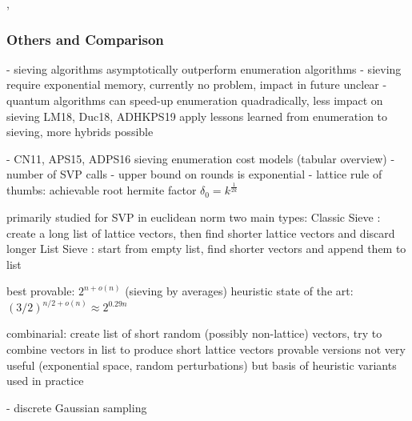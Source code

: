 {\cite{ADHKPS19}, \cite{AGPS20}

\subsubsection{Others and Comparison}

- sieving algorithms asymptotically outperform enumeration algorithms
- sieving require exponential memory, currently no problem, impact in future unclear
- quantum algorithms can speed-up enumeration quadradically, less impact on sieving 
LM18, Duc18, ADHKPS19 apply lessons learned from enumeration to sieving, more hybrids possible




- CN11, APS15, ADPS16
sieving \cite{BDGL16, Laa15,ADPS16, APS15,BDGL16}
enumeration \cite{Kan87, MW15,FP85, CN11, APS15, HPSSWZ17}
cost models (tabular overview) \cite{ACCD+19}
- number of SVP calls \cite{ADPS16,Alb17}
- upper bound on rounds is exponential \cite{HPS11a, GN08b}
- lattice rule of thumbs: achievable root hermite factor $\delta_0 = k^{\frac{1}{2k}} $ %





primarily studied for SVP in euclidean norm
two main types: 
Classic Sieve \cite{AKS01}: create a long list of lattice vectors, then find shorter lattice vectors and discard longer
List Sieve \cite{MV10}: start from empty list, find shorter vectors and append them to list

best provable: $2^{n + o(n)}$ (sieving by averages)
heuristic state of the art: $(3/2)^{n/2 + o(n)} \approx 2^{0.29n}$ 

combinarial: create list of short random (possibly non-lattice) vectors, try to combine vectors in list to produce short lattice vectors
provable versions not very useful (exponential space, random perturbations) but basis of heuristic variants used in practice 


- discrete Gaussian sampling \cite{ADRS15}


}
